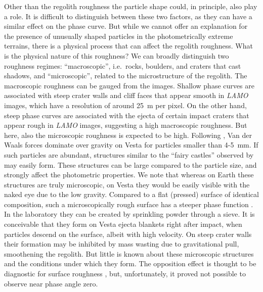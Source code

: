 \documentclass[3p,authoryear]{elsarticle}
\begin{document}
Other than the regolith roughness the particle shape could, in principle, also play a role. It is difficult to distinguish between these two factors, as they can have a similar effect on the phase curve. But while we cannot offer an explanation for the presence of unusually shaped particles in the photometrically extreme terrains, there is a physical process that can affect the regolith roughness. What is the physical nature of this roughness? We can broadly distinguish two roughness regimes: ``macroscopic'', i.e.\ rocks, boulders, and craters that cast shadows, and ``microscopic'', related to the microstructure of the regolith. The macroscopic roughness can be gauged from the images. Shallow phase curves are associated with steep crater walls and cliff faces that appear smooth in {\it LAMO} images, which have a resolution of around 25~m per pixel. On the other hand, steep phase curves are associated with the ejecta of certain impact craters that appear rough in {\it LAMO} images, suggesting a high macroscopic roughness. But here, also the microscopic roughness is expected to be high. Following \citet{S10}, Van der Waals forces dominate over gravity on Vesta for particles smaller than 4-5~mm. If such particles are abundant, structures similar to the ``fairy castles'' observed by \citet{HH63} may easily form. These structures can be large compared to the particle size, and strongly affect the photometric properties. We note that whereas on Earth these structures are truly microscopic, on Vesta they would be easily visible with the naked eye due to the low gravity. Compared to a flat (pressed) surface of identical composition, such a microscopically rough surface has a steeper phase function \citep{C90,S07,SH11}. In the laboratory they can be created by sprinkling powder through a sieve. It is conceivable that they form on Vesta ejecta blankets right after impact, when particles descend on the surface, albeit with high velocity. On steep crater walls their formation may be inhibited by mass wasting due to gravitational pull, smoothening the regolith. But little is known about these microscopic structures and the conditions under which they form. The opposition effect is thought to be diagnostic for surface roughness \citep{K03}, but, unfortunately, it proved not possible to observe near phase angle zero.
\end{document}
